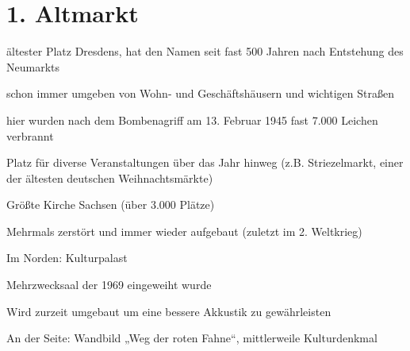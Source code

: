 \documentclass[a4paper,12pt]{report}
\begin{document}
\section{1. Altmarkt}
\begin{itemize*}
\item ältester Platz Dresdens, hat den Namen seit fast 500 Jahren nach Entstehung des Neumarkts
\item schon immer umgeben von Wohn- und Geschäftshäusern und wichtigen Straßen
\item hier wurden nach dem Bombenagriff am 13. Februar 1945 fast 7.000 Leichen verbrannt
\item Platz für diverse Veranstaltungen über das Jahr hinweg (z.B. Striezelmarkt, einer der ältesten deutschen Weihnachtsmärkte)
    \begin{itemize*}
    \item Größte Kirche Sachsen (über 3.000 Plätze)
    \item Mehrmals zerstört und immer wieder aufgebaut (zuletzt im 2. Weltkrieg)
    \end{itemize*}
\item Im Norden: Kulturpalast
    \begin{itemize*}
    \item Mehrzwecksaal der 1969 eingeweiht wurde
    \item Wird zurzeit umgebaut um eine bessere Akkustik zu gewährleisten
    \item An der Seite: Wandbild „Weg der roten Fahne“, mittlerweile Kulturdenkmal
    \end{itemize*}
\end{itemize*}
\end{document}

